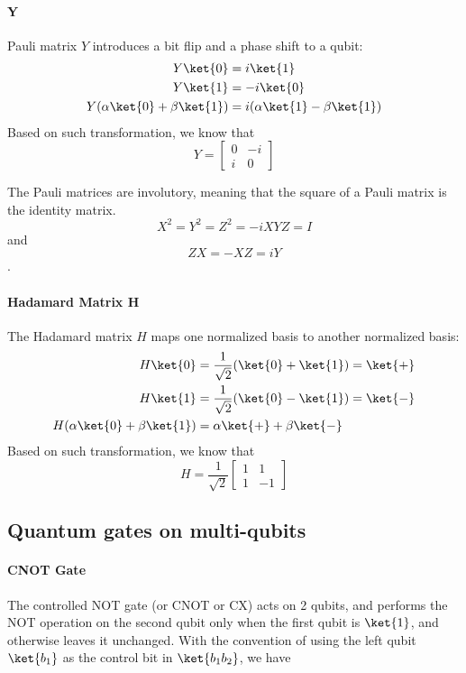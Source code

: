 \paragraph{Y} Pauli matrix \(Y\) introduces a bit flip and a phase shift to a qubit: 
\begin{align*}
    Y \ket{0} &= i\ket{1} \\
    Y \ket{1} &= -i\ket{0} \\
    Y (\alpha \ket{0} + \beta \ket{1}) &= i(\alpha \ket{1} - \beta \ket{1})
\end{align*}
Based on such transformation, we know that 
$$Y = \begin{bmatrix}
    0 & -i \\
    i & 0 
\end{bmatrix}$$

The Pauli matrices are involutory, meaning that the square of a Pauli matrix is the identity matrix.
 \[X^2 = Y^2 = Z^2 = -iXYZ = I\] and \[ZX=-XZ = iY\]. 

\paragraph{Hadamard Matrix H} 
The Hadamard matrix \(H\) maps one normalized basis to another normalized basis: 
\begin{align*}
    H \ket{0} &= \frac{1}{\sqrt{2}}( \ket{0} + \ket{1}) = \ket{+} \\
    H \ket{1} &= \frac{1}{\sqrt{2}}( \ket{0} - \ket{1}) = \ket{-} \\
    H (\alpha \ket{0} + \beta \ket{1}) &= \alpha \ket{+} + \beta \ket{-}
\end{align*}
Based on such transformation, we know that 
$$H = \frac{1}{\sqrt{2}}\begin{bmatrix}
    1 & 1 \\
    1 & -1 
\end{bmatrix}$$


\subsection{Quantum gates on multi-qubits}
\paragraph{CNOT Gate}
The controlled NOT gate (or CNOT or CX) acts on 2 qubits, and performs the NOT operation on the second qubit only when the first qubit is \(\ket{1}\), and otherwise leaves it unchanged. With the convention of using the left qubit \(\ket{b_1}\) as the control bit in \(\ket{b_1b_2}\), we have

